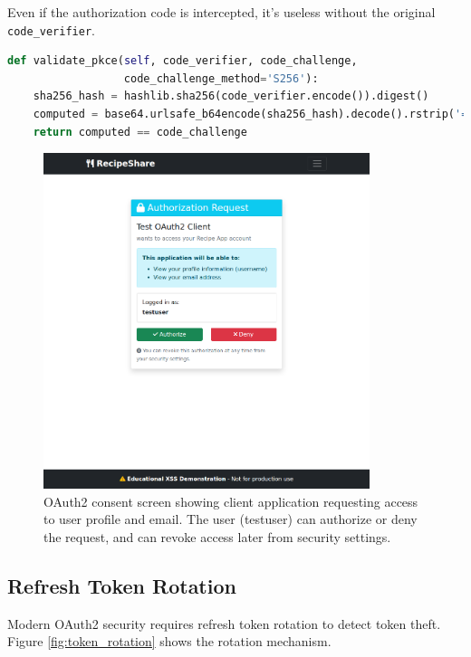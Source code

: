 \documentclass[12pt,a4paper]{article}
\begin{document}
Even if the authorization code is intercepted, it's useless without the original \texttt{code\_verifier}.

\begin{lstlisting}[language=Python, caption=PKCE Validation]
def validate_pkce(self, code_verifier, code_challenge,
                  code_challenge_method='S256'):
    sha256_hash = hashlib.sha256(code_verifier.encode()).digest()
    computed = base64.urlsafe_b64encode(sha256_hash).decode().rstrip('=')
    return computed == code_challenge
\end{lstlisting}

\begin{figure}[H]
    \centering
    \includegraphics[width=0.85\textwidth]{screenshots/oauth2_consent.png}
    \caption{OAuth2 consent screen showing client application requesting access to user profile and email. The user (testuser) can authorize or deny the request, and can revoke access later from security settings.}
    \label{fig:oauth_consent}
\end{figure}

\subsection{Refresh Token Rotation}

Modern OAuth2 security requires refresh token rotation to detect token theft. Figure \ref{fig:token_rotation} shows the rotation mechanism.
\end{document}
